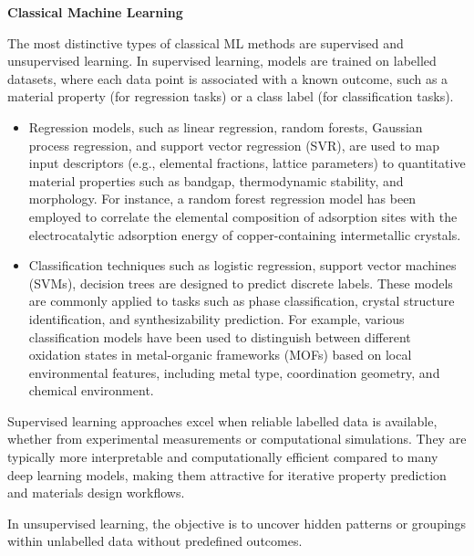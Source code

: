 \textbf{Classical Machine Learning}

The most distinctive types of classical ML methods are supervised and unsupervised learning.
In supervised learning, models are trained on labelled datasets, where each data point is associated with a known outcome, such as a material property (for regression tasks) or a class label (for classification tasks). 
\begin{itemize}
    \item Regression models, such as linear regression, random forests, Gaussian process regression, and support vector regression (SVR), are used to map input descriptors (e.g., elemental fractions, lattice parameters) to quantitative material properties such as bandgap, thermodynamic stability, and morphology\cite{RN563,RN593,RN317,RN13}. For instance, a random forest regression model has been employed to correlate the elemental composition of adsorption sites with the electrocatalytic adsorption energy of copper-containing intermetallic crystals\cite{RN551}. 

    \item Classification techniques such as logistic regression, support vector machines (SVMs), decision trees are designed to predict discrete labels. These models are commonly applied to tasks such as phase classification, crystal structure identification, and synthesizability prediction\cite{RN315,RN580,RN321}. For example, various classification models have been used to distinguish between different oxidation states in metal-organic frameworks (MOFs) based on local environmental features, including metal type, coordination geometry, and chemical environment\cite{RN580}.
    
\end{itemize}

Supervised learning approaches excel when reliable labelled data is available, whether from experimental measurements or computational simulations. They are typically more interpretable and computationally efficient compared to many deep learning models, making them attractive for iterative property prediction and materials design workflows.

In unsupervised learning, the objective is to uncover hidden patterns or groupings within unlabelled data without predefined outcomes. 

